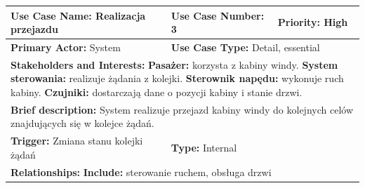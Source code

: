 \documentclass[a4paper,12pt]{article}
\begin{document}
\pagebreak
\begin{table}[h]
\centering
\begin{tabular}{|p{}|p{}|p{}|}
\hline
\textbf{Use Case Name:} Realizacja przejazdu & \textbf{Use Case Number:} 3 & \textbf{Priority:} High \\ \hline
\textbf{Primary Actor:} System & \multicolumn{2}{l|}{\textbf{Use Case Type:} Detail, essential} \\ \hline

\multicolumn{3}{|p{0.9\textwidth}|}{\textbf{Stakeholders and Interests:} \newline
\textbf{Pasażer:} korzysta z kabiny windy. \newline
\textbf{System sterowania:} realizuje żądania z kolejki. \newline
\textbf{Sterownik napędu:} wykonuje ruch kabiny. \newline
\textbf{Czujniki:} dostarczają dane o pozycji kabiny i stanie drzwi.} \\ \hline

\multicolumn{3}{|p{0.9\textwidth}|}{\textbf{Brief description:} System realizuje przejazd kabiny windy do kolejnych celów znajdujących się w kolejce żądań.} \\ \hline

\textbf{Trigger:} Zmiana stanu kolejki żądań & \multicolumn{2}{l|}{\textbf{Type:} Internal} \\ \hline

\multicolumn{3}{|p{0.9\textwidth}|}{\textbf{Relationships:} \newline
\textbf{Include:} sterowanie ruchem, obsługa drzwi} \\ \hline


\end{tabular}
\end{table}
\end{document}
